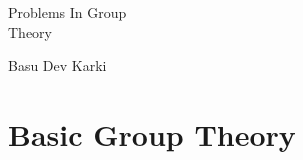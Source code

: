 \documentclass[12pt,oneside]{book}
\begin{document}
\begin{titlepage}
    \centering
    \vspace*{4cm}
    {\Huge Problems In Group\\[0.5em]
    \Huge Theory\\[1em]}
    {\LARGE Basu Dev Karki\par}
\end{titlepage}

\frontmatter
{\thispagestyle{plain}\tableofcontents}

\mainmatter
\chapter{Basic Group Theory}

\eject

\end{document}
